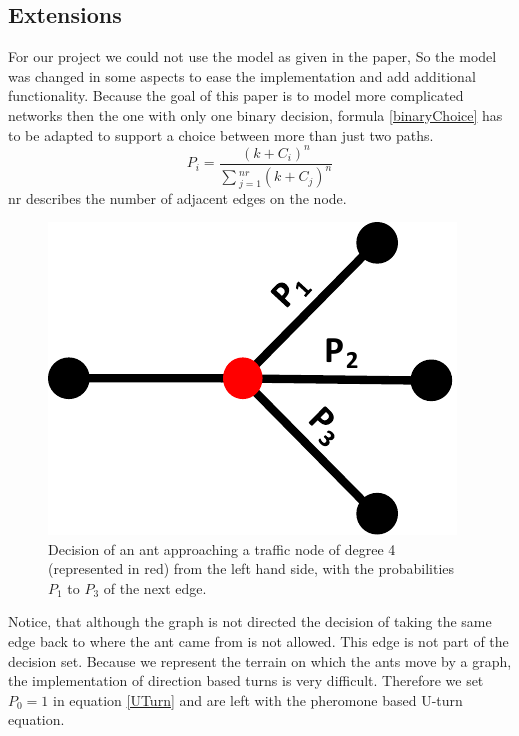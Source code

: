 \subsection{Extensions}
 For our project we could not use the model as given in the paper, So the model was changed in some aspects to ease the implementation and add additional functionality. Because the goal of this paper is to model more complicated networks then the one with only one binary decision, formula \ref{binaryChoice} has to be adapted to support a choice between more than just two paths. 
\begin{equation} \label{multiDecisions}
P_i = \frac{(k+C_i)^n}{\sum{_{j=1}^{nr}(k+C_j)^n}}
\end{equation}  
 nr describes the number of adjacent edges on the node.
\begin{figure}[H]
	\centering
	\includegraphics[scale=0.5]{decision3.pdf}
	\caption{Decision of an ant approaching a traffic node of degree 4 (represented in red) from the left hand side, with the probabilities $P_1$ to $P_3$ of the next edge.}
\end{figure}
Notice, that although the graph is not directed the decision of taking the same edge back to where the ant came from is not allowed. This edge is not part of the decision set.
Because we represent the terrain on which the ants move by a graph, the implementation of direction based turns is very difficult. Therefore we set $P_0 = 1$ in equation \ref{UTurn} and are left with the pheromone based U-turn equation.

